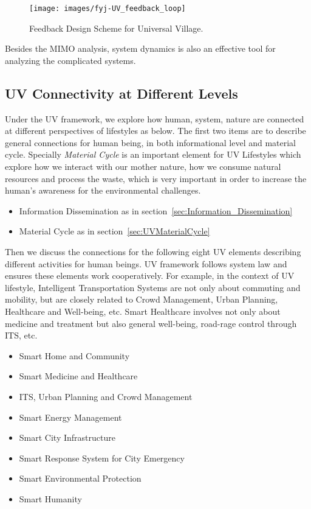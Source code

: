 \documentclass[letterpaper, twocolumn, 10pt, conference]{IEEEtran}
\begin{document}
\begin{figure}[h!]
        \centering
        \texttt{[image: images/fyj-UV\_feedback\_loop]}
        \caption{Feedback Design Scheme for Universal Village.}
        \label{fig:fyj:UV_feedback_loop}
\end{figure}


Besides the MIMO analysis, system dynamics is also an effective tool for analyzing the complicated systems. 



\subsection{UV Connectivity at Different Levels}
\label{ssec:UV.Connectivity}

Under the UV framework, we explore how human, system, nature are connected at different perspectives of lifestyles as below. The first two items are to describe general connections for human being, in both informational level and material cycle. Specially \textit{Material Cycle} is an important element for UV Lifestyles which explore how we interact with our mother nature, how we consume natural resources and process the waste, which is very important in order to increase the human’s awareness for the environmental challenges. 


\begin{itemize}
\item Information Dissemination as in section~\ref{sec:Information_Dissemination}
\item    Material Cycle as in section~\ref{sec:UVMaterialCycle}
\end{itemize}


Then we discuss the connections for the following eight UV elements describing different activities for human beings. UV framework follows system law and ensures these elements work cooperatively. For example, in the context of UV lifestyle, Intelligent Transportation Systems are not only about commuting and mobility, but are closely related to Crowd Management, Urban Planning, Healthcare and Well-being, etc. Smart Healthcare involves not only about medicine and treatment but also general well-being, road-rage control through ITS, etc. %


\begin{itemize}
                \item    Smart Home and Community
                \item    Smart Medicine and Healthcare
                \item    ITS, Urban Planning and Crowd Management
                \item    Smart Energy Management
                \item    Smart City Infrastructure
                \item    Smart Response System for City Emergency
                \item    Smart Environmental Protection
                \item    Smart Humanity
\end{itemize}
\end{document}

